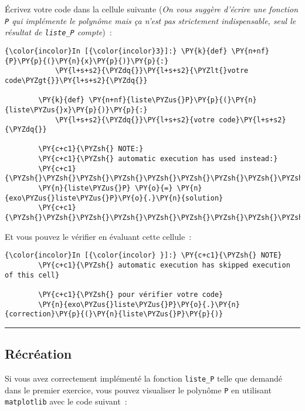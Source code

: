     Écrivez votre code dans la cellule suivante (\emph{On vous suggère
d'écrire une fonction \texttt{P} qui implémente le polynôme mais ça
n'est pas strictement indispensable, seul le résultat de
\texttt{liste\_P} compte})~:

    \begin{Verbatim}[commandchars=\\\{\}]
{\color{incolor}In [{\color{incolor}3}]:} \PY{k}{def} \PY{n+nf}{P}\PY{p}{(}\PY{n}{x}\PY{p}{)}\PY{p}{:}
            \PY{l+s+s2}{\PYZdq{}}\PY{l+s+s2}{\PYZlt{}votre code\PYZgt{}}\PY{l+s+s2}{\PYZdq{}}
        
        \PY{k}{def} \PY{n+nf}{liste\PYZus{}P}\PY{p}{(}\PY{n}{liste\PYZus{}x}\PY{p}{)}\PY{p}{:}
            \PY{l+s+s2}{\PYZdq{}}\PY{l+s+s2}{votre code}\PY{l+s+s2}{\PYZdq{}}
        
        \PY{c+c1}{\PYZsh{} NOTE:}
        \PY{c+c1}{\PYZsh{} automatic execution has used instead:}
        \PY{c+c1}{\PYZsh{}\PYZsh{}\PYZsh{}\PYZsh{}\PYZsh{}\PYZsh{}\PYZsh{}\PYZsh{}\PYZsh{}\PYZsh{}}
        \PY{n}{liste\PYZus{}P} \PY{o}{=} \PY{n}{exo\PYZus{}liste\PYZus{}P}\PY{o}{.}\PY{n}{solution}
        \PY{c+c1}{\PYZsh{}\PYZsh{}\PYZsh{}\PYZsh{}\PYZsh{}\PYZsh{}\PYZsh{}\PYZsh{}\PYZsh{}\PYZsh{}}
\end{Verbatim}


    Et vous pouvez le vérifier en évaluant cette cellule~:

    \begin{Verbatim}[commandchars=\\\{\}]
{\color{incolor}In [{\color{incolor} }]:} \PY{c+c1}{\PYZsh{} NOTE}
        \PY{c+c1}{\PYZsh{} automatic execution has skipped execution of this cell}
        
        \PY{c+c1}{\PYZsh{} pour vérifier votre code}
        \PY{n}{exo\PYZus{}liste\PYZus{}P}\PY{o}{.}\PY{n}{correction}\PY{p}{(}\PY{n}{liste\PYZus{}P}\PY{p}{)}
\end{Verbatim}


    \begin{center}\rule{0.5\linewidth}{\linethickness}\end{center}

    \hypertarget{ruxe9cruxe9ation}{%
\subsection{Récréation}\label{ruxe9cruxe9ation}}

    Si vous avez correctement implémenté la fonction \texttt{liste\_P} telle
que demandé dans le premier exercice, vous pouvez visualiser le polynôme
\texttt{P} en utilisant \texttt{matplotlib} avec le code suivant~:

